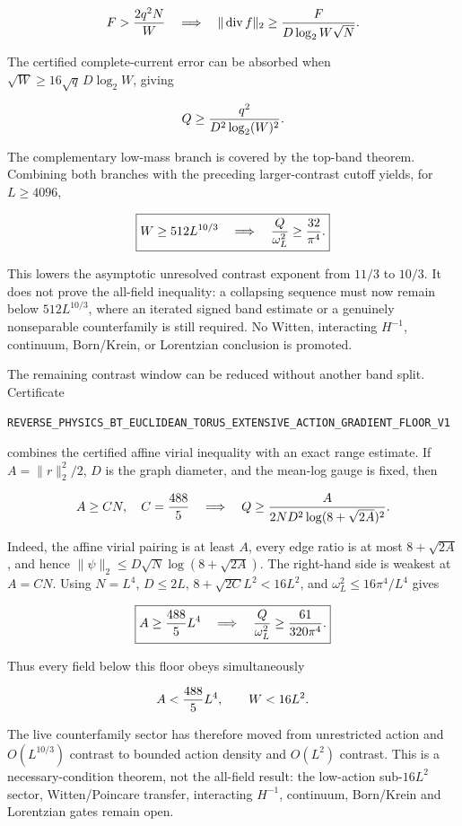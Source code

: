 \documentclass[11pt]{article}
\theoremstyle{definition}
\theoremstyle{remark}
\newcommand{\cert}[1]{\nolinkurl{#1}}
\begin{document}
\[
 F>{2q^2N\over W}
 \quad\Longrightarrow\quad
 \|\operatorname{div}f\|_2
 \geq{F\over D\log_2W\sqrt N}.
\]

The certified complete-current error can be absorbed when
\(\sqrt W\geq16\sqrt q\,D\log_2W\), giving

\[
                         Q\geq{q^2\over D^2\log_2(W)^2}.
\]

The complementary low-mass branch is covered by the top-band theorem.
Combining both branches with the preceding larger-contrast cutoff yields,
for \(L\geq4096\),

\[
 \boxed{
 W\geq512L^{10/3}
 \quad\Longrightarrow\quad
 {Q\over\omega_L^2}\geq{32\over\pi^4}.}
\]

This lowers the asymptotic unresolved contrast exponent from \(11/3\) to
\(10/3\).  It does not prove the all-field inequality: a collapsing sequence
must now remain below \(512L^{10/3}\), where an iterated signed band estimate
or a genuinely nonseparable counterfamily is still required.  No Witten,
interacting \(H^{-1}\), continuum, Born/Krein, or Lorentzian conclusion is
promoted.

The remaining contrast window can be reduced without another band split.
Certificate

\cert{REVERSE_PHYSICS_BT_EUCLIDEAN_TORUS_EXTENSIVE_ACTION_GRADIENT_FLOOR_V1}

combines the certified affine virial inequality with an exact range estimate.
If \(A=\|r\|_2^2/2\), \(D\) is the graph diameter, and the mean-log gauge is
fixed, then

\[
 A\geq CN,\quad C={488\over5}
 \quad\Longrightarrow\quad
 Q\geq{A\over
 2ND^2\log(8+\sqrt{2A})^2}.
\]

Indeed, the affine virial pairing is at least \(A\), every edge ratio is at
most \(8+\sqrt{2A}\), and hence
\(\|\psi\|_2\leq D\sqrt N\log(8+\sqrt{2A})\).  The right-hand side is
weakest at \(A=CN\).  Using \(N=L^4\), \(D\leq2L\),
\(8+\sqrt{2C}L^2<16L^2\), and
\(\omega_L^2\leq16\pi^4/L^4\) gives

\[
 \boxed{
 A\geq{488\over5}L^4
 \quad\Longrightarrow\quad
 {Q\over\omega_L^2}\geq{61\over320\pi^4}.}
\]

Thus every field below this floor obeys simultaneously

\[
                         A<{488\over5}L^4,
                         \qquad W<16L^2.
\]

The live counterfamily sector has therefore moved from unrestricted action
and \(O(L^{10/3})\) contrast to bounded action density and \(O(L^2)\)
contrast.  This is a necessary-condition theorem, not the all-field result:
the low-action sub-\(16L^2\) sector, Witten/Poincare transfer, interacting
\(H^{-1}\), continuum, Born/Krein and Lorentzian gates remain open.
\end{document}
